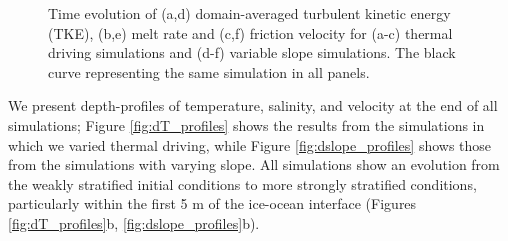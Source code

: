 \documentclass[draft]{agujournal2019}
\begin{document}
\begin{figure}[h!]
\begin{minipage}{0.33\textwidth}
    \end{minipage}
    \caption{Time evolution of (a,d) domain-averaged turbulent kinetic energy (TKE), (b,e) melt rate and (c,f) friction velocity for (a-c) thermal driving simulations and (d-f) variable slope simulations. The black curve representing the same simulation in all panels.}
    \label{fig:timeseries}
\end{figure}

We present depth-profiles of temperature, salinity, and velocity at the end of all simulations; Figure \ref{fig:dT_profiles} shows the results from the simulations in which we varied thermal driving, while Figure \ref{fig:dslope_profiles} shows those from the simulations with varying slope. All simulations show an evolution from the weakly stratified initial conditions to more strongly stratified conditions, particularly within the first 5 m of the ice-ocean interface (Figures \ref{fig:dT_profiles}b, \ref{fig:dslope_profiles}b). 
\end{document}
